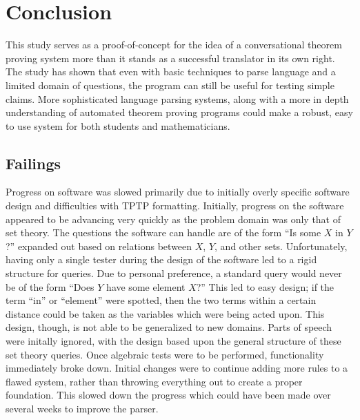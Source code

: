\chapter{Conclusion}

This study serves as a proof-of-concept for the idea of a conversational theorem proving system more than it stands as a successful translator in its own right. The study has shown that even with basic techniques to parse language and a limited domain of questions, the program can still be useful for testing simple claims. More sophisticated language parsing systems, along with a more in depth understanding of automated theorem proving programs could make a robust, easy to use system for both students and mathematicians.

\section{Failings}

Progress on software was slowed primarily due to initially overly specific software design and difficulties with TPTP formatting. Initially, progress on the software appeared to be advancing very quickly as the problem domain was only that of set theory. The questions the software can handle are of the form ``Is some $X$ in $Y$?'' expanded out based on relations between $X$, $Y$, and other sets. Unfortunately, having only a single tester during the design of the software led to a rigid structure for queries. Due to personal preference, a standard query would never be of the form ``Does $Y$ have some element $X$?'' This led to easy design; if the term ``in'' or ``element'' were spotted, then the two terms within a certain distance could be taken as the variables which were being acted upon. This design, though, is not able to be generalized to new domains. Parts of speech were initally ignored, with the design based upon the general structure of these set theory queries. Once algebraic tests were to be performed, functionality immediately broke down. Initial changes were to continue adding more rules to a flawed system, rather than throwing everything out to create a proper foundation. This slowed down the progress which could have been made over several weeks to improve the parser.

